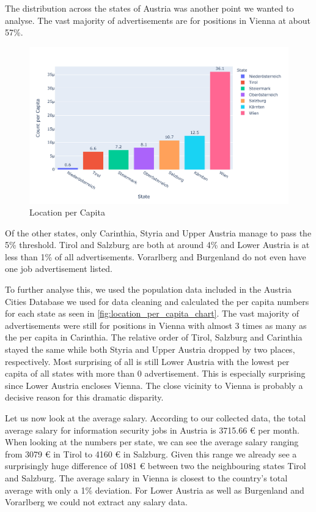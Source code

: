 \documentclass[runningheads]{llncs}
\begin{document}
The distribution across the states of Austria was another point we wanted to analyse. The vast majority of advertisements are for positions in Vienna at about 57\%.

\begin{figure}[H]
	\centering
  \includegraphics[width=\textwidth]{location-per-capita-bar-chart.pdf}
	\caption{Location per Capita}
	\label{fig:location_per_capita_chart}
\end{figure}

Of the other states, only Carinthia, Styria and Upper Austria manage to pass the 5\% threshold. Tirol and Salzburg are both at around 4\% and Lower Austria is at less than 1\% of all advertisements. Vorarlberg and Burgenland do not even have one job advertisement listed.

To further analyse this, we used the population data included in the Austria Cities Database \cite{austria_cities_database} we used for data cleaning and calculated the per capita numbers for each state as seen in \autoref{fig:location_per_capita_chart}. The vast majority of advertisements were still for positions in Vienna with almost 3 times as many as the per capita in Carinthia. The relative order of Tirol, Salzburg and Carinthia stayed the same while both Styria and Upper Austria dropped by two places, respectively. Most surprising of all is still Lower Austria with the lowest per capita of all states with more than 0 advertisement. This is especially surprising since Lower Austria encloses Vienna. The close vicinity to Vienna is probably a decisive reason for this dramatic disparity.

Let us now look at the average salary. According to our collected data, the total average salary for information security jobs in Austria is 3715.66 € per month. When looking at the numbers per state, we can see the average salary ranging from 3079 € in Tirol to 4160 € in Salzburg. Given this range we already see a surprisingly huge difference of 1081 € between two the neighbouring states Tirol and Salzburg. The average salary in Vienna is closest to the country's total average with only a 1\% deviation. For Lower Austria as well as Burgenland and Vorarlberg we could not extract any salary data.
\end{document}
